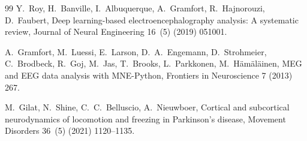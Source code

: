 \documentclass[review,12pt]{elsarticle}
\begin{document}
\begin{thebibliography}{99}
Y.~Roy, H.~Banville, I.~Albuquerque, A.~Gramfort, R.~Hajnorouzi, D.~Faubert, Deep learning-based electroencephalography analysis: A systematic review, Journal of Neural Engineering 16~(5) (2019) 051001.

A.~Gramfort, M.~Luessi, E.~Larson, D.~A.~Engemann, D.~Strohmeier, C.~Brodbeck, R.~Goj, M.~Jas, T.~Brooks, L.~Parkkonen, M.~Hämäläinen, MEG and EEG data analysis with MNE-Python, Frontiers in Neuroscience 7 (2013) 267.

M.~Gilat, N.~Shine, C.~C.~Belluscio, A.~Nieuwboer, Cortical and subcortical neurodynamics of locomotion and freezing in Parkinson's disease, Movement Disorders 36~(5) (2021) 1120--1135.

\end{thebibliography}
\end{document}
